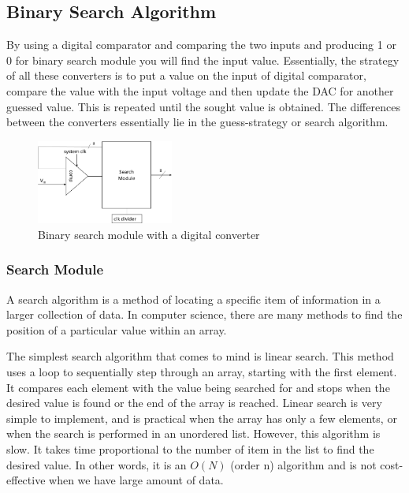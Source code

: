 \documentclass[12pt, logo=tehranDLDL/ut]{tehranDLDL}
\begin{document}
\subsection{Binary Search Algorithm\label{sec:binary-search}}

By using a digital comparator and comparing the two inputs and producing 1 or 0 for binary search module you will find the input value. Essentially, the strategy of all these converters is to put a value on the input of digital comparator, compare the value with the input voltage and then update the DAC for another guessed value. This is repeated until the sought value is obtained. The differences between the converters essentially lie in the guess-strategy or search algorithm.

\begin{figure}
    \centering
    \caption{Binary search module with a digital converter\label{fig:binary-search}}
    \includegraphics[width=0.4\textwidth]{bs}
\end{figure}

\subsubsection{Search Module}

A search algorithm is a method of locating a specific item of information in a larger collection of data.
In computer science, there are many methods to find the position of a particular value within an array.

The simplest search algorithm that comes to mind is linear search. This method uses a loop to sequentially step through an array, starting with the first element. It compares each element with the value being searched for and stops when the desired value is found or the end of the array is reached. Linear search is very simple to implement, and is practical when the array has only a few elements, or when the search is performed in an unordered list. However, this algorithm is slow. It takes time proportional to the number of item in the list to find the desired value. In other words, it is an $O(N)$ (order n) algorithm and is not cost-effective when we have large amount of data.
\end{document}
